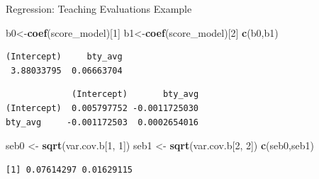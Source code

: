 \documentclass[
  ignorenonframetext,
]{beamer}
\newenvironment{Shaded}{\begin{snugshade}}{\end{snugshade}}
\newcommand{\DecValTok}[1]{\textcolor[rgb]{0.00,0.00,0.81}{#1}}
\newcommand{\FunctionTok}[1]{\textcolor[rgb]{0.13,0.29,0.53}{\textbf{#1}}}
\newcommand{\NormalTok}[1]{#1}
\newcommand{\OtherTok}[1]{\textcolor[rgb]{0.56,0.35,0.01}{#1}}
\newcommand{\SpecialCharTok}[1]{\textcolor[rgb]{0.81,0.36,0.00}{\textbf{#1}}}
\begin{document}
\begin{frame}[fragile]{Regression: Teaching Evaluations Example}
\protect\hypertarget{regression-teaching-evaluations-example-9}{}
\tiny

\begin{Shaded}
\begin{Highlighting}[]
\NormalTok{b0}\OtherTok{\textless{}{-}}\FunctionTok{coef}\NormalTok{(score\_model)[}\DecValTok{1}\NormalTok{]}
\NormalTok{b1}\OtherTok{\textless{}{-}}\FunctionTok{coef}\NormalTok{(score\_model)[}\DecValTok{2}\NormalTok{]}
\FunctionTok{c}\NormalTok{(b0,b1)}
\end{Highlighting}
\end{Shaded}

\begin{verbatim}
(Intercept)     bty_avg 
 3.88033795  0.06663704 
\end{verbatim}

\begin{Shaded}
\end{Shaded}

\begin{verbatim}
             (Intercept)       bty_avg
(Intercept)  0.005797752 -0.0011725030
bty_avg     -0.001172503  0.0002654016
\end{verbatim}

\begin{Shaded}
\begin{Highlighting}[]
\NormalTok{seb0 }\OtherTok{\textless{}{-}} \FunctionTok{sqrt}\NormalTok{(var.cov.b[}\DecValTok{1}\NormalTok{, }\DecValTok{1}\NormalTok{])}
\NormalTok{seb1 }\OtherTok{\textless{}{-}} \FunctionTok{sqrt}\NormalTok{(var.cov.b[}\DecValTok{2}\NormalTok{, }\DecValTok{2}\NormalTok{])}
\FunctionTok{c}\NormalTok{(seb0,seb1)}
\end{Highlighting}
\end{Shaded}

\begin{verbatim}
[1] 0.07614297 0.01629115
\end{verbatim}

\normalsize
\end{frame}
\end{document}
